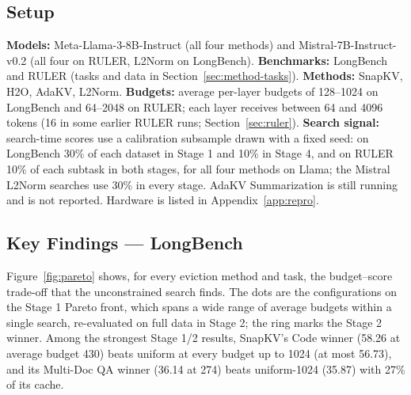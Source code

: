 \documentclass[11pt]{article}
\begin{document}
\begin{table}[t]

  \centering
  \footnotesize
  \setlength{\tabcolsep}{6.5pt}
  \renewcommand{\arraystretch}{0.92}
  
  \caption{\textbf{RULER results (full data, string-match accuracy averaged over 11 subtasks).} Uniform allocation vs.\ MOSAIC's final configuration (the better of Winner and NAS-refined) at the same average per-layer budget; the better is in bold. $^\dagger$Rescaled Stage 3 winner (no Stage 4 search). (Mistral): Mistral-7B-Instruct-v0.2; other rows Llama-3-8B-Instruct, of which SnapKV and H2O at B1024 and above used an earlier 3--4-candidate selection. --: not evaluated.}
  \label{tab:ruler-summary}
\end{table}







\subsection{Setup}

\textbf{Models:} Meta-Llama-3-8B-Instruct (all four methods) and Mistral-7B-Instruct-v0.2 (all four on RULER, L2Norm on LongBench). \textbf{Benchmarks:} LongBench and RULER (tasks and data in Section~\ref{sec:method-tasks}). \textbf{Methods:} SnapKV, H2O, AdaKV, L2Norm. \textbf{Budgets:} average per-layer budgets of 128--1024 on LongBench and 64--2048 on RULER; each layer receives between 64 and 4096 tokens (16 in some earlier RULER runs; Section~\ref{sec:ruler}). \textbf{Search signal:} search-time scores use a calibration subsample drawn with a fixed seed: on LongBench 30\% of each dataset in Stage 1 and 10\% in Stage 4, and on RULER 10\% of each subtask in both stages, for all four methods on Llama; the Mistral L2Norm searches use 30\% in every stage. AdaKV Summarization is still running and is not reported. Hardware is listed in Appendix~\ref{app:repro}.





\subsection{Key Findings — LongBench}
\label{sec:which-stage}

Figure~\ref{fig:pareto} shows, for every eviction method and task, the budget--score trade-off that the unconstrained search finds. The dots are the configurations on the Stage 1 Pareto front, which spans a wide range of average budgets within a single search, re-evaluated on full data in Stage 2; the ring marks the Stage 2 winner. Among the strongest Stage 1/2 results, SnapKV's Code winner (58.26 at average budget 430) beats uniform at every budget up to 1024 (at most 56.73), and its Multi-Doc QA winner (36.14 at 274) beats uniform-1024 (35.87) with 27\% of its cache.
\end{document}
